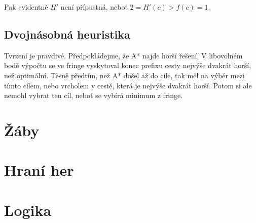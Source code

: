 \documentclass[a4paper]{article}
\begin{document}
\vspace{0.5cm}

Pak evidentně $H'$ není přípustná, neboť $2 = H'(c) > f(c) = 1$.

\subsection{Dvojnásobná heuristika}

Tvrzení je pravdivé. Předpokládejme, že A* najde horší řešení. V libovolném bodě výpočtu se ve fringe vyskytoval konec prefixu cesty nejvýše dvakrát horší, než optimální. Těsně předtím, než A* došel až do cíle, tak měl na výběr mezi tímto cílem, nebo vrcholem v cestě, která je nejvýše dvakrát horší. Potom si ale nemohl vybrat ten cíl, neboť se vybírá minimum z fringe.

\section{Žáby}

\section{Hraní her}

\section{Logika}
\end{document}
